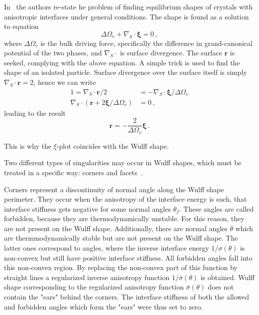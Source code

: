 In~\cite{Cahn1974} the authors re-state he problem of finding equilibrium shapes of crystals with anisotropic interfaces under general conditions. The shape is found as a solution to equation
\begin{equation} \label{eq_xivec_equilibrium_shape}
    \Delta\Omega_v + \nabla_S\cdot \bm{\xi} = 0 \,,
\end{equation}
where $\Delta\Omega_v$ is the bulk driving force, specifically the difference in grand-canonical potential of the two phases, and $\nabla_S\cdot$ is surface divergence. The surface $\bm{r}$ is seeked, complying with the above equation. A simple trick is used to find the shape of an isolated particle. Surface divergence over the surface itself is simply $\nabla_S\cdot\bm{r}=2$, hence we can write
\begin{align}
    1 = \nabla_S\cdot\bm{r}/2 &= -\nabla_S\cdot\bm{\xi}/\Delta\Omega_v \\
     \nabla_S\cdot(\bm{r} +2\bm{\xi}/\Delta\Omega_v) &=0 \,,
\end{align}
leading to the result
\begin{equation}
    \bm{r} = -\frac{2}{\Delta\Omega_v}\bm{\xi} \,.
\end{equation}

This is why the $\xi$-plot coincides with the Wulff shape.

Two different types of singularities may occur in Wulff shapes, which must be treated in a specific way: corners and facets~\cite{Kobayashi2001, Fleck2011}. 

Corners represent a discontinuity of normal angle along the Wulff shape perimeter. They occur when the anisotropy of the interface energy is such, that interface stiffness gets negative for some normal angles $\theta_f$. These angles are called forbidden, because they are thermodynamically unstable. For this reason, they are not present on the Wulff shape. Additionally, there are normal angles $\theta$ which are thermmodynamically stable but are not present on the Wulff shape. The latter ones correspond to angles, where the inverse interface energy $1/\sigma(\theta)$ is non-convex but still have positive interface stiffness. All forbidden angles fall into this non-convex region. By replacing the non-convex part of this function by straight lines a regularized inverse anisotropy function $1/\bar{\sigma}(\theta)$ is obtained. Wulff shape corresponding to the regularized anisotropy function $\bar{\sigma}(\theta)$ does not contain the "ears" behind the corners. The interface stiffness of both the allowed and forbidden angles which form the "ears" were thus set to zero.


